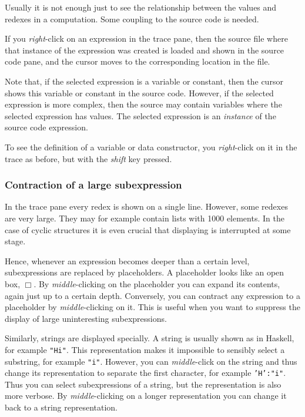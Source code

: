 \documentclass[12pt]{article}
\newcommand{\emptyBox}{\Box}
\begin{document}
Usually it is not enough just to see the relationship between the values and redexes in a computation. Some coupling to the source code is needed.

If you \emph{right}-click on an expression in the trace pane, then the source file where that instance of the expression was created is loaded and shown in the source code pane, and the cursor moves to the corresponding location in the file.

Note that, if the selected expression is a variable or constant, then the cursor shows this variable or constant in the source code. However, if the selected expression is more complex, then the source may contain variables where the selected expression has values. The selected expression is an \emph{instance} of the source code expression.

To see the definition of a variable or data constructor, you \emph{right}-click on it in the trace as before, but with the \emph{shift} key pressed.


\subsubsection{Contraction of a large subexpression}

In the trace pane every redex is shown on a single line.
However, some redexes are very large. They may for example contain lists with 1000 elements. In the case of cyclic structures it is even crucial that displaying is interrupted at some stage. 

Hence, whenever an expression becomes deeper than a certain level, subexpressions are replaced by placeholders. A placeholder looks like an open box, $\emptyBox$. By \emph{middle}-clicking on the placeholder you can expand its contents, again just up to a certain depth. Conversely, you can contract any expression to a placeholder by \emph{middle}-clicking on it. This is useful when you want to suppress the display of large uninteresting subexpressions.

Similarly, strings are displayed specially. A string is usually shown as in Haskell, for example \texttt{"Hi"}. This representation makes it impossible to sensibly select a substring, for example \texttt{"i"}. However, you can \emph{middle}-click on the string and thus change its representation to separate the first character, for example \texttt{'H':"i"}. Thus you can select subexpressions of a string, but the representation is also more verbose. By \emph{middle}-clicking on a longer representation you can change it back to a string representation.
\end{document}
